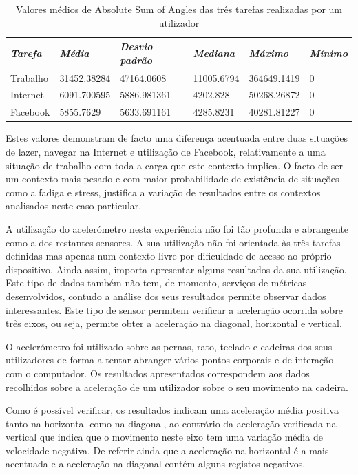 {\renewcommand{\arraystretch}{1.6}
\begin{table}[!htb]
\centering
\label{tab:a_tbk}
\vspace{2pt}
\begin{tabular}{ | l | l | l | l | l | l |  }
\hline
\textit{Tarefa}&\textit{Média}&\textit{Desvio padrão}&\textit{Mediana} & \textit{Máximo} & \textit{Mínimo}\\  
\hline
Trabalho&31452.38284&47164.0608&11005.6794&364649.1419&0 \\
Internet&6091.700595&5886.981361&4202.828&50268.26872&0 \\
Facebook&5855.7629&5633.691161&4285.8231&40281.81227&0 \\
\hline
\end{tabular}
\caption{Valores médios de Absolute Sum of Angles das três tarefas realizadas por um utilizador} 
\end{table}}

Estes valores demonstram de facto uma diferença acentuada entre duas situações de lazer, navegar na Internet e utilização de Facebook, relativamente a uma situação de trabalho com toda a carga que este contexto implica. O facto de ser um contexto mais pesado e com maior probabilidade de existência de situações como a fadiga e stress, justifica a variação de resultados entre os contextos analisados neste caso particular.

A utilização do acelerómetro nesta experiência não foi tão profunda e abrangente como a dos restantes sensores. A sua utilização não foi orientada às três tarefas definidas mas apenas num contexto livre por dificuldade de acesso ao próprio dispositivo. Ainda assim, importa apresentar alguns resultados da sua utilização. Este tipo de dados também não tem, de momento, serviços de métricas desenvolvidos, contudo a análise dos seus resultados permite observar dados interessantes. Este tipo de sensor permitem verificar a aceleração ocorrida sobre três eixos, ou seja, permite obter a aceleração na diagonal, horizontal e vertical.

O acelerómetro foi utilizado sobre as pernas, rato, teclado e cadeiras dos seus utilizadores de forma a tentar abranger vários pontos corporais e de interação com o computador. Os resultados apresentados correspondem aos dados recolhidos sobre a aceleração de um utilizador sobre o seu movimento na cadeira. 

Como é possível verificar, os resultados indicam uma aceleração média positiva tanto na horizontal como na diagonal, ao contrário da aceleração verificada na vertical que indica que o movimento neste eixo tem uma variação média de velocidade negativa. De referir ainda que a aceleração na horizontal é a mais acentuada e a aceleração na diagonal contém alguns registos negativos.

